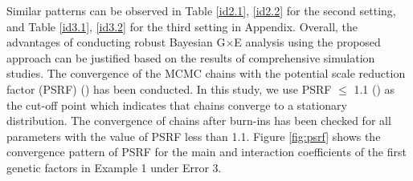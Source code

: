 \documentclass[12pt]{article}
\begin{document}
Similar patterns can be observed in Table \ref{id2.1}, \ref{id2.2} for the second setting, and Table \ref{id3.1}, \ref{id3.2} for the third setting in Appendix. Overall, the advantages of conducting robust Bayesian G$\times$E analysis using the proposed approach can be justified based on the results of comprehensive simulation studies. The convergence of the MCMC chains with the potential scale reduction factor (PSRF) (\cite{BROOK}) has been conducted. In this study, we use PSRF $\leq$ 1.1 (\cite{GEL}) as the cut-off point which indicates that chains converge to a stationary distribution. The convergence of chains after burn-ins has been checked for all parameters with the value of PSRF less than 1.1. Figure \ref{fig:psrf} shows the convergence pattern of PSRF for the main and interaction coefficients of the first genetic factors in Example 1 under Error 3.


\end{document}
